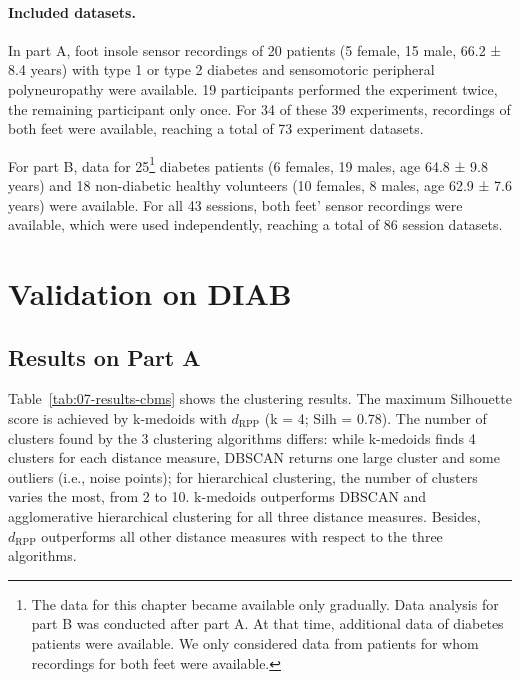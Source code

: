 \documentclass[
  oneside]{book}
\begin{document}
\paragraph*{Included datasets.}

In part A, foot insole sensor recordings of 20 patients (5 female, 15 male, 66.2 ± 8.4 years) with type 1 or type 2 diabetes and sensomotoric peripheral polyneuropathy were available.
19 participants performed the experiment twice, the remaining participant only once.
For 34 of these 39 experiments, recordings of both feet were available, reaching a total of 73 experiment datasets.

For part B, data for 25\footnote{The data for this chapter became available only gradually. Data analysis for part B was conducted after part A. At that time, additional data of diabetes patients were available. We only considered data from patients for whom recordings for both feet were available.} diabetes patients (6 females, 19 males, age 64.8 ± 9.8 years) and 18 non-diabetic healthy volunteers (10 females, 8 males, age 62.9 ± 7.6 years) were available.
For all 43 sessions, both feet' sensor recordings were available, which were used independently, reaching a total of 86 session datasets.

\hypertarget{diabfoot-results}{%
\section{Validation on DIAB}\label{diabfoot-results}}

\hypertarget{results-on-part-a}{%
\subsection{Results on Part A}\label{results-on-part-a}}

Table~\ref{tab:07-results-cbms} shows the clustering results.
The maximum Silhouette score is achieved by k-medoids with \(d_{\text{RPP}}\) (k = 4; Silh = 0.78).
The number of clusters found by the 3 clustering algorithms differs: while k-medoids finds 4 clusters for each distance measure, DBSCAN returns one large cluster and some outliers (i.e., noise points); for hierarchical clustering, the number of clusters varies the most, from 2 to 10.
k-medoids outperforms DBSCAN and agglomerative hierarchical clustering for all three distance measures.
Besides, \(d_{\text{RPP}}\) outperforms all other distance measures with respect to the three algorithms.
\end{document}
